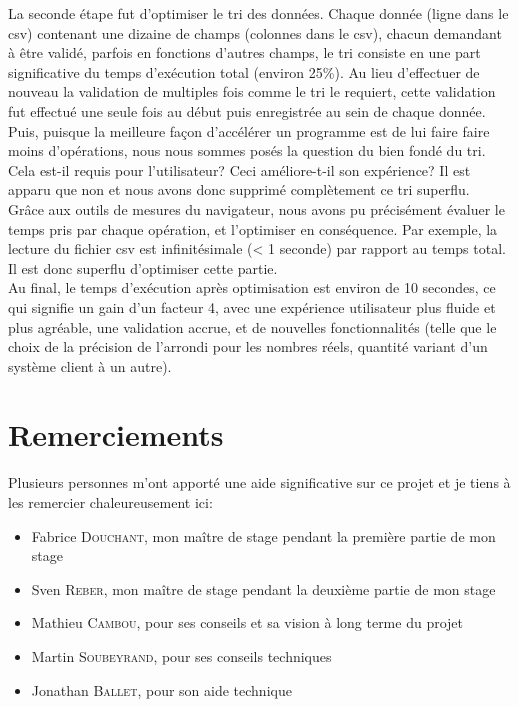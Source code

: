 \documentclass[a4paper,french,12pt]{article}
\begin{document}
	La seconde étape fut d'optimiser le tri des données. Chaque donnée (ligne dans le csv) contenant une dizaine de champs (colonnes dans le csv), chacun demandant à être validé, parfois en fonctions d'autres champs, le tri consiste en une part significative du temps d'exécution total (environ 25\%). Au lieu d'effectuer de nouveau la validation de multiples fois comme le tri le requiert, cette validation fut effectué une seule fois au début puis enregistrée au sein de chaque donnée. 
	Puis, puisque la meilleure façon d'accélérer un programme est de lui faire faire moins d'opérations, nous nous sommes posés la question du bien fondé du tri. Cela est-il requis pour l'utilisateur? Ceci améliore-t-il son expérience? Il est apparu que non et nous avons donc supprimé complètement ce tri superflu.~\\	
	
	Grâce aux outils de mesures du navigateur, nous avons pu précisément évaluer le temps pris par chaque opération, et l'optimiser en conséquence. Par exemple, la lecture du fichier csv est infinitésimale (< 1 seconde) par rapport au temps total. Il est donc superflu d'optimiser cette partie.~\\	
	
	Au final, le temps d'exécution après optimisation est environ de 10 secondes, ce qui signifie un gain d'un facteur 4, avec une expérience utilisateur plus fluide et plus agréable, une validation accrue, et de nouvelles fonctionnalités (telle que le choix de la précision de l'arrondi pour les nombres réels, quantité variant d'un système client à un autre).
   


\section{Remerciements}

	Plusieurs personnes m’ont apporté une aide significative sur ce projet et je tiens à les remercier chaleureusement ici:~\\	

	\begin{itemize} 
		\item Fabrice \textsc{Douchant}, mon maître de stage pendant la première partie de mon stage
		\item Sven \textsc{Reber}, mon maître de stage pendant la deuxième partie de mon stage
		\item Mathieu \textsc{Cambou}, pour ses conseils et sa vision à long terme du projet
		\item Martin \textsc{Soubeyrand}, pour ses conseils techniques
		\item Jonathan \textsc{Ballet}, pour son aide technique
	\end{itemize}
\end{document}
